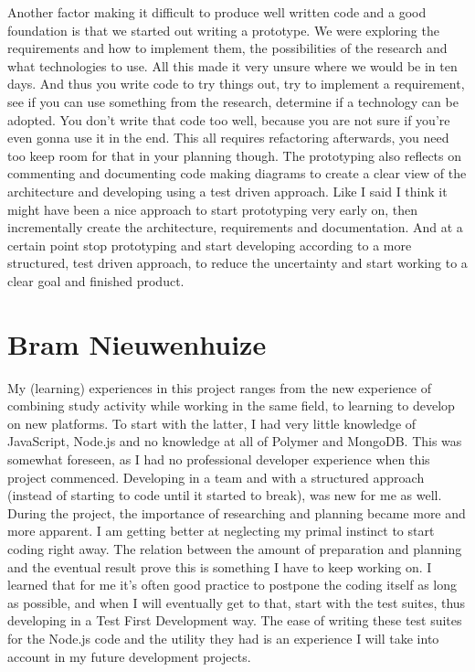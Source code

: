Another factor making it difficult to produce well written code
and a good foundation
is that we started out writing a prototype.
We were exploring the requirements and how to implement them,
the possibilities of the research
and what technologies to use.
All this made it very unsure where we would be in ten days.
And thus you write code to try things out,
try to implement a requirement,
see if you can use something from the research,
determine if a technology can be adopted.
You don't write that code too well,
because you are not sure if you're even gonna use it in the end.
This all requires refactoring afterwards,
you need too keep room for that in your planning though.
The prototyping also reflects on commenting and documenting code
making diagrams to create a clear view of the architecture
and developing using a test driven approach.
Like I said I think it might have been a nice approach
to start prototyping very early on,
then incrementally create the architecture, requirements and documentation.
And at a certain point stop prototyping
and start developing according to a more structured, test driven approach,
to reduce the uncertainty
and start working to a clear goal and finished product.

\section{Bram Nieuwenhuize}
My (learning) experiences in this project ranges from the new experience of 
combining study activity while working in the same field, to learning to develop 
on new platforms.
To start with the latter, I had very little knowledge of 
JavaScript, Node.js and no knowledge at all of Polymer and 
MongoDB. This was somewhat foreseen, as I had no 
professional developer experience when this project 
commenced. Developing in a team and with a
structured approach (instead of starting to code until it started to break),
was new for me as well. During the project, the importance of 
researching and planning became more and more apparent. I am getting better
at neglecting my primal instinct to start coding right away. The relation 
between the amount of preparation and planning and the eventual result prove 
this is something I have to keep working on. I learned that for me it's often
good practice to postpone the coding itself as long as possible, and when I will
eventually get to that, start with the test suites, thus developing in a Test 
First Development way. The ease of writing these test suites for the Node.js
code and the utility they had is an experience I will take into account in my
future development projects.

